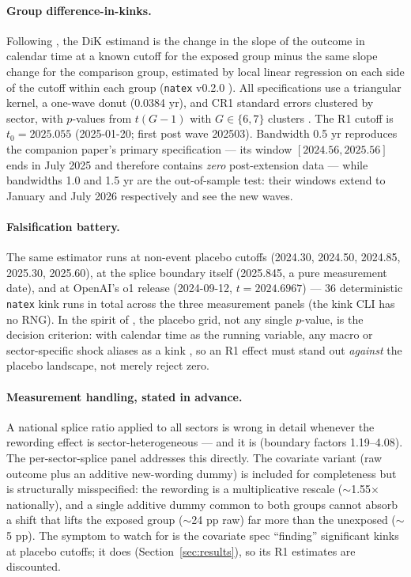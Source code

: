 \documentclass[11pt]{article}
\newcommand{\natex}{\texttt{natex}}
\begin{document}
\paragraph{Group difference-in-kinks.} Following \cite{bockerman2025}, the
DiK estimand is the change in the slope of the outcome in calendar time at a
known cutoff for the exposed group minus the same slope change for the
comparison group, estimated by local linear regression on each side of the
cutoff within each group (\natex{} v0.2.0 \cite{natex}). All specifications
use a triangular kernel, a one-wave donut (0.0384 yr), and CR1 standard
errors clustered by sector, with $p$-values from $t(G-1)$ with $G \in
\{6,7\}$ clusters \cite{cameron2015}. The R1 cutoff is $t_0=2025.055$
(2025-01-20; first post wave 202503). Bandwidth 0.5 yr reproduces the
companion paper's primary specification --- its window $[2024.56, 2025.56]$
ends in July 2025 and therefore contains \emph{zero} post-extension data ---
while bandwidths 1.0 and 1.5 yr are the out-of-sample test: their windows
extend to January and July 2026 respectively and see the new waves.

\paragraph{Falsification battery.} The same estimator runs at non-event
placebo cutoffs (2024.30, 2024.50, 2024.85, 2025.30, 2025.60), at the splice
boundary itself (2025.845, a pure measurement date), and at OpenAI's o1
release (2024-09-12, $t=2024.6967$) --- 36 deterministic \natex{} kink runs
in total across the three measurement panels (the kink CLI has no RNG). In
the spirit of \cite{ganong2018}, the placebo grid, not any single $p$-value,
is the decision criterion: with calendar time as the running variable, any
macro or sector-specific shock aliases as a kink \cite{hausman2018}, so an R1
effect must stand out \emph{against} the placebo landscape, not merely reject
zero.

\paragraph{Measurement handling, stated in advance.} A national splice ratio
applied to all sectors is wrong in detail whenever the rewording effect is
sector-heterogeneous --- and it is (boundary factors 1.19--4.08). The
per-sector-splice panel addresses this directly. The covariate variant (raw
outcome plus an additive new-wording dummy) is included for completeness but
is structurally misspecified: the rewording is a multiplicative rescale
($\sim$1.55$\times$ nationally), and a single additive dummy common to both
groups cannot absorb a shift that lifts the exposed group ($\sim$24 pp raw)
far more than the unexposed ($\sim$5 pp). The symptom to watch for is the
covariate spec ``finding'' significant kinks at placebo cutoffs; it does
(Section~\ref{sec:results}), so its R1 estimates are discounted.
\end{document}
